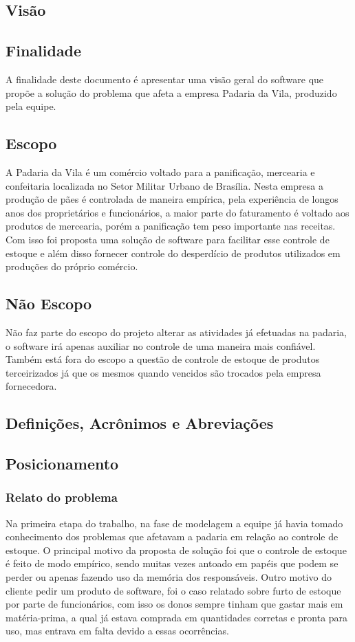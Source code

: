 \begin{appendices}
\chapter{Visão}

\section{Finalidade}
	A finalidade deste documento é apresentar uma visão geral do software que propõe a solução do problema que afeta a empresa Padaria da Vila, produzido pela equipe.

\section{Escopo}
	A Padaria da Vila é um comércio voltado para a panificação, mercearia e confeitaria localizada no Setor Militar Urbano de Brasília. Nesta empresa a produção de pães é controlada de maneira empírica, pela experiência de longos anos dos proprietários e funcionários, a maior parte do faturamento é voltado aos produtos de mercearia, porém a panificação tem peso importante nas receitas. Com isso foi proposta uma solução de software para facilitar esse controle de estoque e além disso fornecer controle do desperdício de produtos utilizados em produções do próprio comércio.


\section{Não Escopo}
	Não faz parte do escopo do projeto alterar as atividades já efetuadas na padaria, o software irá apenas auxiliar no controle de uma maneira mais confiável.
	Também está fora do escopo a questão de controle de estoque de produtos terceirizados já que os mesmos quando vencidos são trocados pela empresa fornecedora.

\section{Definições, Acrônimos e Abreviações}

\section{Posicionamento}

\subsection{Relato do problema}
	Na primeira etapa do trabalho, na fase de modelagem a equipe já havia tomado conhecimento dos problemas que afetavam a padaria em relação ao controle de estoque.
	O principal motivo da proposta de solução foi que o controle de estoque é feito de modo empírico, sendo muitas vezes antoado em papéis que podem se perder ou apenas fazendo uso da memória dos responsáveis. Outro motivo do cliente pedir um produto de software, foi o caso relatado sobre furto de estoque por parte de funcionários, com isso os donos sempre tinham que gastar mais em matéria-prima, a qual já estava comprada em quantidades corretas e pronta para uso, mas entrava em falta devido a essas ocorrências.


\end{appendices}
